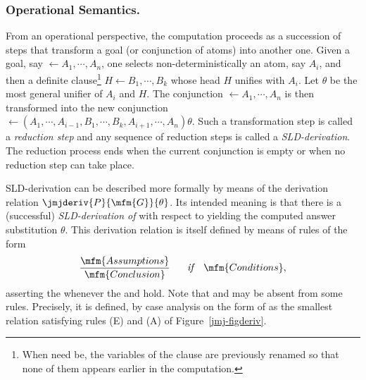 \subsubsection{Operational Semantics.}
\begin{sloppypar}
From an operational perspective, the computation proceeds
as a succession of steps that transform a goal (or conjunction of atoms)
into another one. Given a goal, say
\( \leftarrow A_{1}, \cdots, A_{n} \),
one selects non-deterministically an atom, say $A_i$, and then a
definite clause\footnote{%
  When need be, the variables of the clause are previously
  renamed so that none of them appears earlier in the computation.
}
\( H \leftarrow B_{1},  \cdots , B_{k} \)
whose head $H$ unifies with $A_i$.
Let $\theta$ be the most general unifier of $A_{i}$ and $H$.  The
conjunction
\( \leftarrow A_{1}, \cdots, A_{n} \)
is then transformed into the new conjunction 
 \( \leftarrow ( A_{1}, \cdots, A_{i-1}, B_{1},
 \cdots, B_{k}, A_{i+1}, \cdots, A_{n} ) \theta.  \)
 Such a transformation step is called a \textit{reduction step} and any
 sequence of reduction steps is called a \textit{SLD-derivation}.  The
 reduction process ends when the current conjunction is empty or when
 no reduction step can take place.
 \end{sloppypar}
   
SLD-derivation can be described more formally by means of the derivation relation
\( \jmjderiv{P}{\mfm{G}}{\theta} \).
 Its intended meaning is that there is a (successful) {\em SLD-derivation of\/}  with respect to 
 yielding the computed answer substitution $\theta$. This derivation relation is
 itself defined by means of rules of the form
 \[\frac{\mfm{Assumptions}}{\mfm{Conclusion}} \hspace*{4ex}
    \mbox{\textit{if}}
 \hspace*{2ex} \mfm{Conditions},  \]
asserting the  whenever the  and
 hold. Note that  and 
 may be absent from some rules.  Precisely, it is defined, by case
 analysis on the form of  as the smallest relation satisfying 
 rules (E) and (A) of Figure~\ref{jmj-figderiv}.

